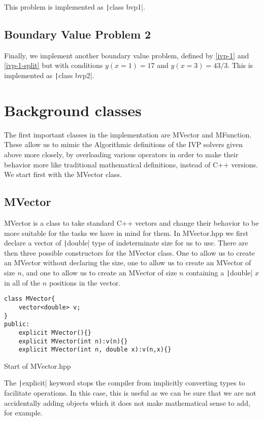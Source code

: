 \documentclass[a4paper,11pt]{report}
\begin{document}
This problem is implemented as \texttt|class bvp1|.

\subsection*{Boundary Value Problem 2}

Finally, we implement another boundary value problem, defined by \ref{ivp-1} and \ref{ivp-1-split} but with conditions $y(x=1) = 17$ and $y(x=3) = 43/3$. This is implemented as \texttt|class bvp2|.

\section{Background classes}

The first important classes in the implementation are MVector and MFunction. These allow us to mimic the Algorithmic definitions of the IVP solvers given above more closely, by overloading various operators in order to make their behavior more like traditional mathematical definitions, instead of C++ versions. We start first with the MVector class.

\subsection{MVector}

MVector is a class to take standard C++ vectors and change their behavior to be more suitable for the tasks we have in mind for them. In MVector.hpp we first declare a vector of \texttt|double| type of indeterminate size for us to use. There are then three possible constructors for the MVector class. One to allow us to create an MVector without declaring the size, one to allow us to create an MVector of size $n$, and one to allow us to create an MVector of size $n$ containing a \texttt|double| $x$ in all of the $n$ positions in the vector.
\begin{listing}[H]
\begin{verbatim}
class MVector{
	vector<double> v;
}
public:
	explicit MVector(){}
	explicit MVector(int n):v(n){}
	explicit MVector(int n, double x):v(n,x){}
\end{verbatim}
\caption{Start of MVector.hpp}
\end{listing}
The \texttt|explicit| keyword stops the compiler from implicitly converting types to facilitate operations. In this case, this is useful as we can be sure that we are not accidentally adding objects which it does not make mathematical sense to add, for example.
\end{document}
